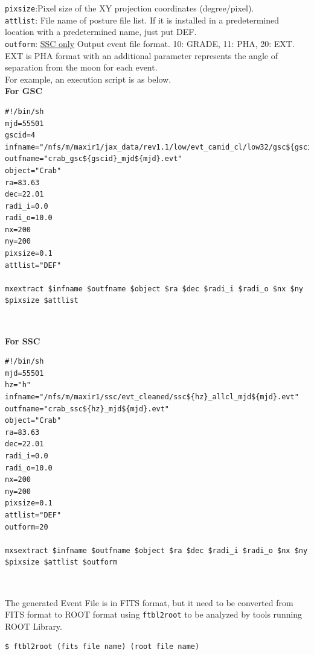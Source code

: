 \documentclass[10pt]{report}
\renewcommand{\_}{\textscale{.5}{\textbf{\textunderscore}}}
\begin{document}
\noindent \texttt{pixsize}:Pixel size of the XY projection coordinates (degree/pixel).\\

\noindent \texttt{attlist}: File name of posture file list. If it is installed in a predetermined location with a predetermined name, just put DEF. \\

\noindent \texttt{outform}: \underline{SSC only} Output event file format. 10: GRADE, 11: PHA, 20: EXT. EXT is PHA format with an additional parameter represents the angle of separation from the moon for each event. \\

For example, an execution script is as below. \\

\noindent\textbf{For GSC}\\
\begin{lstlisting}
#!/bin/sh
mjd=55501
gscid=4
infname="/nfs/m/maxir1/jax_data/rev1.1/low/evt_camid_cl/low32/gsc${gscid}_r2pcl_MJD${mjd}.evt"
outfname="crab_gsc${gscid}_mjd${mjd}.evt"
object="Crab"
ra=83.63
dec=22.01
radi_i=0.0
radi_o=10.0
nx=200
ny=200
pixsize=0.1
attlist="DEF"

mxextract $infname $outfname $object $ra $dec $radi_i $radi_o $nx $ny $pixsize $attlist
\end{lstlisting}

\

\noindent\textbf{For SSC}\\
\begin{lstlisting}
#!/bin/sh
mjd=55501
hz="h"
infname="/nfs/m/maxir1/ssc/evt_cleaned/ssc${hz}_allcl_mjd${mjd}.evt"
outfname="crab_ssc${hz}_mjd${mjd}.evt"
object="Crab"
ra=83.63
dec=22.01
radi_i=0.0
radi_o=10.0
nx=200
ny=200
pixsize=0.1
attlist="DEF"
outform=20

mxsextract $infname $outfname $object $ra $dec $radi_i $radi_o $nx $ny $pixsize $attlist $outform
\end{lstlisting}

\

The generated Event File is in FITS format, but it need to be converted from FITS format to ROOT format using \texttt{ftbl2root} to be analyzed by tools running ROOT Library. \\

\begin{lstlisting}
$ ftbl2root (fits file name) (root file name)
\end{lstlisting}
\end{document}
